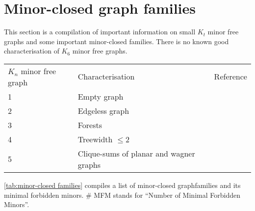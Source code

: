 \section{Minor-closed graph families}\label{sec:minor_closed_families}
This section is a compilation of important information on small $K_t$ minor free graphs and some important minor-closed families. There is no known good characterisation of $K_6$ minor free graphs. 

\begin{table}[h!]
    \centering
    \begin{tabular}{@{}lll@{}}
        \toprule
        $K_n$ minor free graph  & Characterisation  & Reference \\
        1                       & Empty graph       &           \\
        2                       & Edgeless graph    &           \\
        3                       & Forests           &           \\
        4                       & Treewidth $\leq 2$&  {\textcite{norinMath599GraphMinors2017}}         \\
        5                       & Clique-sums of planar and wagner graphs & {\textcite{wagnerUeberEigenschaftEbenen1937}}
    \end{tabular}
\end{table}


\cref{tab:minor-closed families} compiles a list of minor-closed graphfamilies and its minimal forbidden minors. \# MFM stands for ``Number of Minimal Forbidden Minors''.

